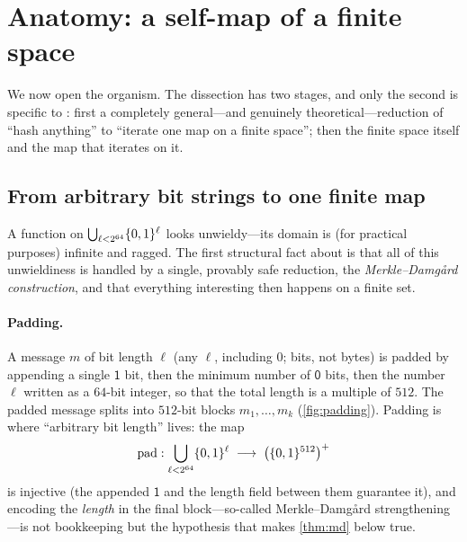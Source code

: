 \section{Anatomy: a self-map of a finite space}\label{sec:geometry}

We now open the organism. The dissection has two stages, and only the
second is specific to \SHA{}: first a completely general---and genuinely
theoretical---reduction of ``hash anything'' to ``iterate one map on a
finite space''; then the finite space itself and the map that \SHA{}
iterates on it.

\subsection{From arbitrary bit strings to one finite map}
\label{sec:merkledamgard}

A function on $\bigcup_{\ell < 2^{64}} \{0,1\}^\ell$ looks
unwieldy---its domain is (for practical purposes) infinite and
ragged. The first structural fact about \SHA{} is that all of this
unwieldiness is handled by a single, provably safe reduction, the
\emph{Merkle--Damg{\aa}rd construction}, and that everything interesting
then happens on a finite set.

\paragraph{Padding.} A message $m$ of bit length $\ell$ (any $\ell$,
including $0$; bits, not bytes) is padded by appending a single
$\mathsf{1}$ bit, then the minimum number of $\mathsf{0}$ bits, then the
number $\ell$ written as a $64$-bit integer, so that the total length is a
multiple of $512$. The padded message splits into $512$-bit blocks
$m_1, \dots, m_k$ (\cref{fig:padding}). Padding is where ``arbitrary bit
length'' lives: the map
\[
  \mathrm{pad} : \bigcup_{\ell < 2^{64}} \{0,1\}^{\ell}
  \;\longrightarrow\; \bigl(\{0,1\}^{512}\bigr)^{+}
\]
is injective (the appended $\mathsf{1}$ and the length field between them
guarantee it), and encoding the \emph{length} in the final block---so-called
Merkle--Damg{\aa}rd strengthening---is not bookkeeping but the hypothesis
that makes \cref{thm:md} below true.

